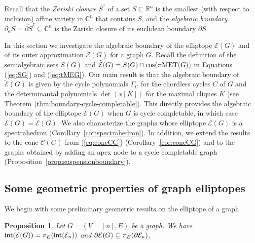 \documentclass[a4paper, 11pt, twoside]{article}
\newcommand{\C}{\mathbb{C}}
\newcommand{\R}{\mathbb{R}}
\newcommand{\ME}{{\mathcal E}}
\newcommand{\MET}{\text{\rm MET}}
\newcommand{\MCscr}{{\mathscr {C}}}
\newcommand{\tME}{\widetilde \ME}
\theoremstyle{plain}
\newtheorem{proposition}[theorem]{Proposition}
\begin{document}
Recall that the \emph{Zariski closure} $\overline {S}^z$ of a set $S\subseteq \R^n$ is the smallest (with respect to inclusion) affine variety in $\C^n$ that contains $S$, and the {\em algebraic boundary} $\partial_a S=\overline{\partial S}^z \subseteq \mathbb{C}^n$ is the Zariski closure of its euclidean boundary $\partial S$.

In this section we investigate the algebraic boundary of the elliptope $\ME(G)$ and of its outer approximation $\tME(G)$ for a graph $G$. Recall the definition of the semialgebraic sets $S(G)$ and $\tME(G)=S(G)\cap\cos(\pi\MET(G))$  in Equations (\ref{eq:SG}) and  (\ref{eq:tMEG}).
Our main result is that  
 the algebraic boundary of  $\tME(G)$  is given by the cycle polynomials $\Gamma_C$ for the chordless cycles $C$ of $G$ and the determinantal polynomials $\det(x[K])$ for the maximal cliques $K$ (see Theorem~\ref{thm:boundary-cycle-completable}). This directly provides the algebraic boundary of the elliptope $\ME(G)$ when $G$ is cycle completable, in which case $\ME(G) = \tME(G)$.
We also characterize the graphs whose elliptope $\ME(G)$ is a spectrahedron (Corollary~\ref{cor:spectrahedron}). In addition, we extend the results to the cone $\MCscr(G)$ from (\ref{eq:coneCG}) (Corollary~\ref{cor:coneCG}) and to the graphs obtained by adding an apex node to a cycle completable graph (Proposition~\ref{prop:suspensionboundary}). 



\subsection{Some geometric properties of graph elliptopes}

We begin with  some preliminary geometric results on the elliptope of a graph. 


\begin{proposition}\label{proposition:piboundEn}
    Let $G=(V=[n],E)$ be a graph. 
    We have ${\rm int} ({\cal E}(G))=\pi_E({\rm int} ( {\cal E}_n))$ and 
 $\partial {\cal E}(G)\subseteq \pi_E(\partial {\cal E}_n)$.
\end{proposition}
\end{document}
